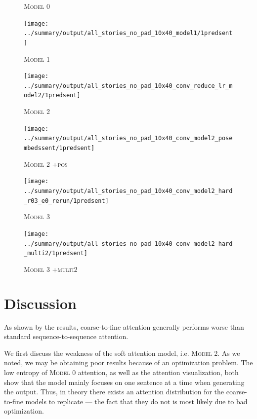 \documentclass[12pt]{report}
\begin{document}
\begin{figure}[p]
\centering
\caption{\textsc{Model 0}}
\end{figure}

\begin{figure}[p]
\centering
\texttt{[image: ../summary/output/all\_stories\_no\_pad\_10x40\_model1/1predsent]}
\caption{\textsc{Model 1}}
\end{figure}

\begin{figure}[p]
\centering
\texttt{[image: ../summary/output/all\_stories\_no\_pad\_10x40\_conv\_reduce\_lr\_model2/1predsent]}
\caption{\textsc{Model 2}}
\end{figure}

\begin{figure}[p]
\centering
\texttt{[image: ../summary/output/all\_stories\_no\_pad\_10x40\_conv\_model2\_posembedssent/1predsent]}
\caption{\textsc{Model 2 +pos}}
\end{figure}

\begin{figure}[p]
\centering
\texttt{[image: ../summary/output/all\_stories\_no\_pad\_10x40\_conv\_model2\_hard\_r03\_e0\_rerun/1predsent]}
\caption{\textsc{Model 3}}
\end{figure}

\begin{figure}[p]
\centering
\texttt{[image: ../summary/output/all\_stories\_no\_pad\_10x40\_conv\_model2\_hard\_multi2/1predsent]}
\caption{\textsc{Model 3 +multi2}}
\end{figure}


\section{Discussion}

As shown by the results, coarse-to-fine attention generally performs worse than standard sequence-to-sequence attention.

We first discuss the weakness of the soft attention model, i.e. \textsc{Model 2}. As we noted, we may be obtaining poor results because of an optimization problem. The low entropy of \textsc{Model 0} attention, as well as the attention visualization, both show that the model mainly focuses on one sentence at a time when generating the output. Thus, in theory there exists an attention distribution for the coarse-to-fine models to replicate --- the fact that they do not is most likely due to bad optimization.
\end{document}
